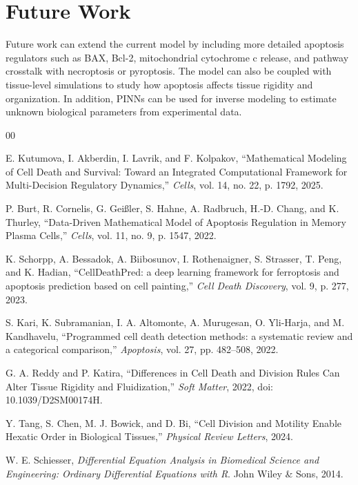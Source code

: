 \documentclass[conference]{IEEEtran}
\begin{document}
\section{Future Work}
Future work can extend the current model by including more detailed apoptosis regulators such as BAX, Bcl-2, mitochondrial cytochrome c release, and pathway crosstalk with necroptosis or pyroptosis. The model can also be coupled with tissue-level simulations to study how apoptosis affects tissue rigidity and organization. In addition, PINNs can be used for inverse modeling to estimate unknown biological parameters from experimental data.



\begin{thebibliography}{00}

E. Kutumova, I. Akberdin, I. Lavrik, and F. Kolpakov, ``Mathematical Modeling of Cell Death and Survival: Toward an Integrated Computational Framework for Multi-Decision Regulatory Dynamics,'' \textit{Cells}, vol. 14, no. 22, p. 1792, 2025.

P. Burt, R. Cornelis, G. Gei{\ss}ler, S. Hahne, A. Radbruch, H.-D. Chang, and K. Thurley, ``Data-Driven Mathematical Model of Apoptosis Regulation in Memory Plasma Cells,'' \textit{Cells}, vol. 11, no. 9, p. 1547, 2022.

K. Schorpp, A. Bessadok, A. Biibosunov, I. Rothenaigner, S. Strasser, T. Peng, and K. Hadian, ``CellDeathPred: a deep learning framework for ferroptosis and apoptosis prediction based on cell painting,'' \textit{Cell Death Discovery}, vol. 9, p. 277, 2023.

S. Kari, K. Subramanian, I. A. Altomonte, A. Murugesan, O. Yli-Harja, and M. Kandhavelu, ``Programmed cell death detection methods: a systematic review and a categorical comparison,'' \textit{Apoptosis}, vol. 27, pp. 482--508, 2022.

G. A. Reddy and P. Katira, ``Differences in Cell Death and Division Rules Can Alter Tissue Rigidity and Fluidization,'' \textit{Soft Matter}, 2022, doi: 10.1039/D2SM00174H.

Y. Tang, S. Chen, M. J. Bowick, and D. Bi, ``Cell Division and Motility Enable Hexatic Order in Biological Tissues,'' \textit{Physical Review Letters}, 2024.

W. E. Schiesser, \textit{Differential Equation Analysis in Biomedical Science and Engineering: Ordinary Differential Equations with R}. John Wiley \& Sons, 2014.

\end{thebibliography}
\end{document}
